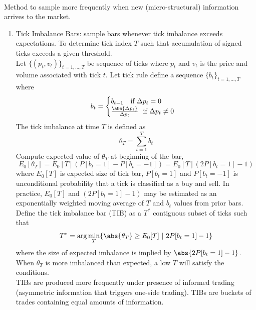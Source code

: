 \begin{remark} \\
Method to sample more frequently when new (micro-structural) information arrives to the market.
\begin{enumerate}[label=\roman*.]
\setlength{\itemsep}{0pt}
\item Tick Imbalance Bars: sample bars whenever tick imbalance exceeds expectations. To determine tick index $T$ such that accumulation of signed ticks exceeds a given threshold.\\
Let $\{(p_t, v_t)\}_{t=1, \ldots, T}$ be sequence of ticks where $p_t$ and $v_t$ is the price and volume associated with tick $t$. Let tick rule define a sequence $\{b_t\}_{t=1, \ldots, T}$ where
\begin{align*}
b_t = 
\begin{cases}
b_{t-1} \ \ \ \text{if } \Delta p_t = 0 \\
\frac{\abs{\Delta p_t}}{\Delta p_t} \ \ \text{if } \Delta p_t \neq 0
\end{cases} \nonumber
\end{align*}
The tick imbalance at time $T$ is defined as 
\begin{equation*}
\theta_T = \sum\limits_{t=1}^T b_t \nonumber
\end{equation*}
Compute expected value of $\theta_T$ at beginning of the bar,
\begin{equation*}
E_0[\theta_T] = E_0 [T](P[b_t = 1] - P[b_t = -1]) = E_0 [T](2P[b_t = 1] - 1) \nonumber
\end{equation*}
where $E_0[T]$ is expected size of tick bar, $P[b_t = 1]$ and $P[b_t = -1]$ is unconditional probability that a tick is classified as a buy and sell. In practice, $E_0[T]$ and $(2P[b_t = 1] - 1)$ may be estimated as an exponentially weighted moving average of $T$ and $b_t$ values from prior bars.\\
Define the tick imbalance bar (TIB) as a $T^{*}$ contiguous subset of ticks such that
\begin{equation*}
T^{*} = \arg \min_T \{ \abs{\theta_T} \geq E_0 [T] \ \vert \ 2 P[b_t = 1] - 1 \} \nonumber
\end{equation*}
where the size of expected imbalance is implied by $\abs{2 P[b_t = 1] - 1}$.\\
When $\theta_T$ is more imbalanced than expected, a low $T$ will satisfy the conditions.\\
TIBs are produced more frequently under presence of informed trading (asymmetric information that triggers one-side trading). TIBs are buckets of trades containing equal amounts of information.

\end{enumerate}
\end{remark}
